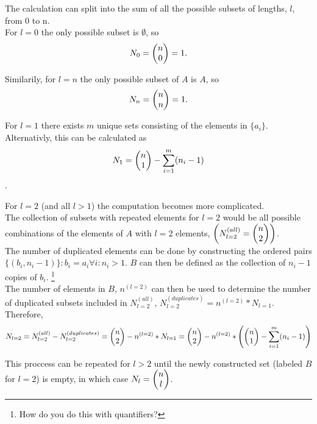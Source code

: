 \documentclass[]{article}
\begin{document}
The calculation can split into the sum of all the possible subsets of lengths, $l$,
from 0 to n.\\
For $l=0$ the only possible subset is $\emptyset$,
so $$N_0 = \mqty(n \\ 0) = 1.$$

Similarily, for $l=n$ the only possible subset of $A$ is $A$, 
so $$N_n = \mqty(n \\ n) = 1.$$

For $l=1$ there exists $m$ unique sets consisting of the elements in $\{a_i\}$.
Alternativly, this can be calculated as
$$N_1 = \mqty(n\\1) - \sum_{i=1}^m (n_i - 1)$$.

For $l=2$ (and all $l>1$) the computation becomes more complicated.\\
The collection of subsets with repeated elements for $l=2$ would be all possible 
combinations of the elements of $A$ with $l=2$ elements, $\qty(N_{l=2}^{(all)} = \mqty(n\\2))$.\\

The number of duplicated elements can be done by constructing the ordered pairs 
$\{(b_i,n_i-1)\}: b_i = a_i \forall i : n_i > 1$. $B$ can then be defined as the collection 
of $n_i - 1$ copies of $b_i$. \footnote{How do you do this with quantifiers?}\\

The number of elements in $B$, $n^{(l=2)}$ can then be used to determine the number of duplicated 
subsets included in $N_{l=2}^{(all)}$, $N_{l=2}^{(duplicates)} = n^{(l=2)} * N_{l=1}$. Therefore,
$$N_{l=2} = N_{l=2}^{(all)} - N_{l=2}^{(duplicates)} 
= \mqty(n\\2) - n^{(l=2)} * N_{l=1} 
= \mqty(n\\2) - n^{(l=2)} * \qty(\mqty(n\\1) - \sum_{i=1}^m (n_i - 1))$$

This proccess can be repeated for $l > 2$ until the newly constructed set (labeled $B$ for $l=2$) is empty,
in which case $N_{l} = \mqty(n\\l)$.\\
\end{document}

